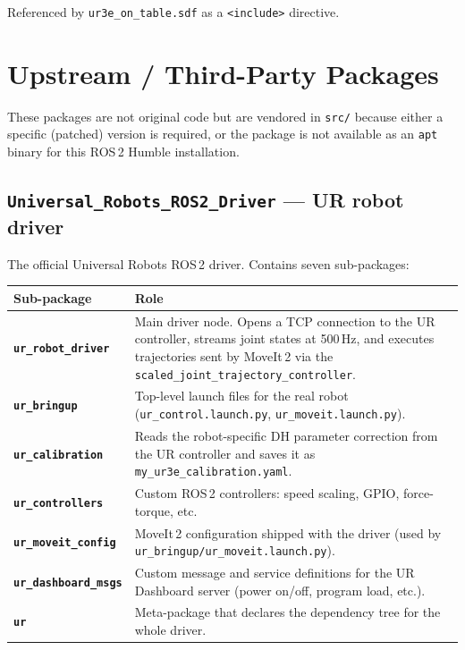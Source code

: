 \documentclass[11pt,a4paper]{article}
\newcommand{\pkg}[1]{\texttt{\textbf{#1}}}
\newcommand{\file}[1]{\texttt{#1}}
\begin{document}
Referenced by \file{ur3e\_on\_table.sdf} as a \texttt{<include>} directive.

\newpage
\section{Upstream / Third-Party Packages}

These packages are not original code but are vendored in \file{src/}
because either a specific (patched) version is required, or the package
is not available as an \texttt{apt} binary for this ROS\,2 Humble
installation.

\subsection{\texttt{Universal\_Robots\_ROS2\_Driver} --- UR robot driver}

The official Universal Robots ROS\,2 driver. Contains seven sub-packages:

\begin{center}
\begin{tabular}{|l|p{9cm}|}
\hline
\textbf{Sub-package} & \textbf{Role} \\
\hline
\pkg{ur\_robot\_driver} &
  Main driver node. Opens a TCP connection to the UR controller,
  streams joint states at 500\,Hz, and executes trajectories sent by
  MoveIt\,2 via the \texttt{scaled\_joint\_trajectory\_controller}. \\
\hline
\pkg{ur\_bringup} &
  Top-level launch files for the real robot
  (\file{ur\_control.launch.py}, \file{ur\_moveit.launch.py}). \\
\hline
\pkg{ur\_calibration} &
  Reads the robot-specific DH parameter correction from the UR controller
  and saves it as \file{my\_ur3e\_calibration.yaml}. \\
\hline
\pkg{ur\_controllers} &
  Custom ROS\,2 controllers: speed scaling, GPIO, force-torque, etc. \\
\hline
\pkg{ur\_moveit\_config} &
  MoveIt\,2 configuration shipped with the driver (used by
  \file{ur\_bringup/ur\_moveit.launch.py}). \\
\hline
\pkg{ur\_dashboard\_msgs} &
  Custom message and service definitions for the UR Dashboard server
  (power on/off, program load, etc.). \\
\hline
\pkg{ur} &
  Meta-package that declares the dependency tree for the whole driver. \\
\hline
\end{tabular}
\end{center}
\end{document}
